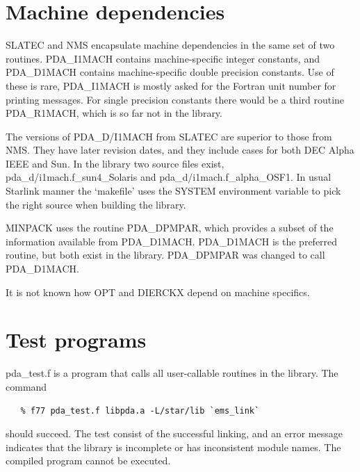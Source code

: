 \documentclass[11pt,twoside]{article}
\newcommand{\htmlref}[2]{#1}
\newcommand{\xlabel}[1]{}
\begin{document}

\section{\xlabel{machine_dependencies}Machine dependencies}

   SLATEC and NMS encapsulate machine dependencies in the same set of
   two routines.
\htmlref{PDA\_\-I1MACH}{PDA\_I1MACH}
   contains machine-specific integer constants, and
\htmlref{PDA\_D1MACH}{PDA\_D1MACH}
   contains machine-specific double precision constants. Use of these is
   rare, PDA\_I1MACH is mostly asked for the Fortran unit number for printing
   messages. For single precision constants there would be a third
   routine PDA\_R1MACH, which is so far not in the library.

   The versions of PDA\_D/I1MACH from SLATEC are superior to those from NMS.
   They have later revision dates, and they include cases for both DEC
   Alpha IEEE and Sun. In the library two source files exist,
   pda\_d/i1mach.f\_sun4\_Solaris and pda\_d/i1mach.f\_alpha\_OSF1. In
   usual Starlink manner the `makefile' uses the SYSTEM environment
   variable to pick the right source when building the library.

   MINPACK uses the routine PDA\_DPMPAR, which provides a subset of the
   information available from PDA\_D1MACH. PDA\_D1MACH is the preferred
   routine, but both exist in the library. PDA\_DPMPAR was changed to
   call PDA\_D1MACH.

   It is not known how OPT and DIERCKX depend on machine specifics.


\section{\xlabel{test_programs}Test programs}

   pda\_test.f is a program that calls all user-callable routines in the
   library. The command

\begin{verbatim}
   % f77 pda_test.f libpda.a -L/star/lib `ems_link`
\end{verbatim}

   should succeed. The test consist of the successful linking, and an
   error message indicates that the library is incomplete or has
   inconsistent module names. The compiled program cannot be executed.
\end{document}
